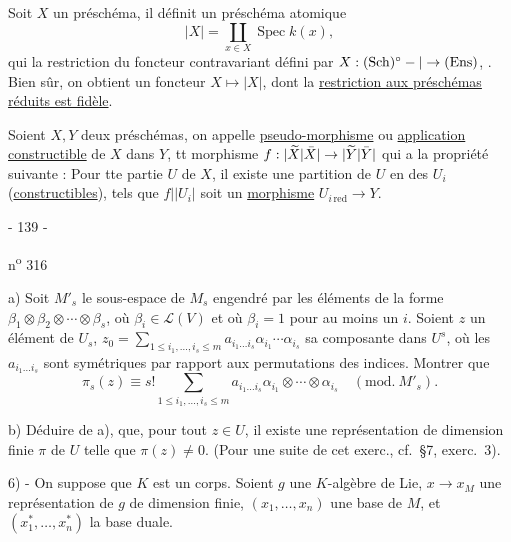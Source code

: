 Soit $X$ un préschéma, il définit un préschéma atomique
\[
|X|=\coprod_{x\in X}\operatorname{Spec}k(x),
\]
qui  
la restriction du foncteur contravariant défini par
$X:(\mathrm{Sch})^\circ-|\to(\mathrm{Ens})$,
.
Bien sûr, on obtient un foncteur $X\mapsto|X|$,
dont la \uline{restriction aux préschémas réduits est fidèle}.

Soient $X,Y$ deux préschémas, on appelle \uline{pseudo-morphisme}
ou \uline{application constructible} de $X$ dans $Y$, tt morphisme
$f:|\widetilde X|\bar X|\to|\widetilde Y|\bar Y|$
qui a la propriété suivante : Pour tte partie
  $U$ de $X$,
il existe une partition de $U$ en des $U_i$ 
(\uline{constructibles}), tels que $f||U_i|$ soit un
\uline{morphisme} $U_{i\,\mathrm{red}}\to Y$.



\begin{center}- 139 -\end{center}
\hfill n\textsuperscript{o} 316

a) Soit $M'_s$ le sous-espace de $M_s$ engendré par les éléments de la forme $\beta_1\otimes\beta_2\otimes\cdots\otimes\beta_s$, où $\beta_i\in\mathcal L(V)$ et où $\beta_i=1$ pour au moins un $i$. Soient $z$ un élément de $U_s$, $z_0=\sum_{1\leq i_1,\ldots,i_s\leq m}a_{i_1\ldots i_s}\alpha_{i_1}\cdots\alpha_{i_s}$ sa composante dans $U^s$, où les $a_{i_1\ldots i_s}$ sont symétriques par rapport aux permutations des indices. Montrer que
\[
\pi_s(z)\equiv s!\sum_{1\leq i_1,\ldots,i_s\leq m}a_{i_1\ldots i_s}\alpha_{i_1}\otimes\cdots\otimes\alpha_{i_s}\quad(\mathrm{mod.}\ M'_s).
\]

b) Déduire de a), que, pour tout $z\in U$, il existe une représentation de dimension finie $\pi$ de $U$ telle que $\pi(z)\neq0$. (Pour une suite de cet exerc., cf.\ §7, exerc.\ 3).

6) - On suppose que $K$ est un corps. Soient $g$ une $K$-algèbre de Lie, $x\longrightarrow x_M$ une représentation de $g$ de dimension finie, $(x_1,\ldots,x_n)$ une base de $M$, et $(x_1^*,\ldots,x_n^*)$ la base duale.

